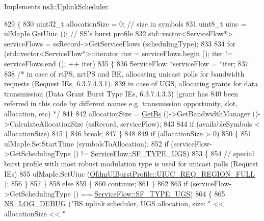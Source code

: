 Implements \hyperlink{classns3_1_1UplinkScheduler_ab0fb68e0b8923cbec983dbcffbe7a63f}{ns3\+::\+Uplink\+Scheduler}.


\begin{DoxyCode}
829 \{
830   uint32\_t allocationSize = 0; \textcolor{comment}{// size in symbols}
831   uint8\_t uiuc = ulMapIe.GetUiuc (); \textcolor{comment}{// SS's burst profile}
832   std::vector<ServiceFlow*> serviceFlows = ssRecord->GetServiceFlows (schedulingType);
833 
834   \textcolor{keywordflow}{for} (std::vector<ServiceFlow*>::iterator iter = serviceFlows.begin (); iter != serviceFlows.end (); ++
      iter)
835     \{
836       ServiceFlow *serviceFlow = *iter;
837 
838       \textcolor{comment}{/* in case of rtPS, nrtPS and BE, allocating unicast polls for bandwidth requests (Request IEs,
       6.3.7.4.3.1).}
839 \textcolor{comment}{       in case of UGS, allocating grants for data transmission (Data Grant Burst Type IEs, 6.3.7.4.3.3)
       (grant has}
840 \textcolor{comment}{       been referred in this code by different names e.g. transmission opportunity, slot, allocation, etc) 
      */}
841 
842       allocationSize = \hyperlink{classns3_1_1UplinkScheduler_afe61b7de71d92d2dff1b135744a6ff7e}{GetBs} ()->GetBandwidthManager ()->CalculateAllocationSize (ssRecord, 
      serviceFlow);
843 
844       \textcolor{keywordflow}{if} (availableSymbols < allocationSize)
845         \{
846           \textcolor{keywordflow}{break};
847         \}
848 
849       \textcolor{keywordflow}{if} (allocationSize > 0)
850         \{
851           ulMapIe.SetStartTime (symbolsToAllocation);
852           \textcolor{keywordflow}{if} (serviceFlow->GetSchedulingType () != \hyperlink{classns3_1_1ServiceFlow_a7990ba10be1e098328fd1e6382a26235a969e0b62fa12fef1dbb23913744ed594}{ServiceFlow::SF\_TYPE\_UGS})
853             \{
854               \textcolor{comment}{// special burst profile with most robust modulation type is used for unicast polls (Request
       IEs)}
855               ulMapIe.SetUiuc (\hyperlink{classns3_1_1OfdmUlBurstProfile_ae528783c4b3c6700ff49dfd7a555cb3daae074d10caa7fe18da973227c7f9942f}{OfdmUlBurstProfile::UIUC\_REQ\_REGION\_FULL}
      );
856             \}
857         \}
858       \textcolor{keywordflow}{else}
859         \{
860           \textcolor{keywordflow}{continue};
861         \}
862 
863       \textcolor{keywordflow}{if} (serviceFlow->GetSchedulingType () == \hyperlink{classns3_1_1ServiceFlow_a7990ba10be1e098328fd1e6382a26235a969e0b62fa12fef1dbb23913744ed594}{ServiceFlow::SF\_TYPE\_UGS})
864         \{
865           \hyperlink{group__logging_ga413f1886406d49f59a6a0a89b77b4d0a}{NS\_LOG\_DEBUG} (\textcolor{stringliteral}{"BS uplink scheduler, UGS allocation, size: "} << allocationSize << \textcolor{stringliteral}{"
}
\end{DoxyCode}
